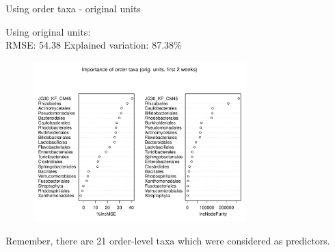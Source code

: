 \documentclass{beamer}
\begin{document}
\begin{frame}{Using order taxa - original units}

  {\scriptsize
    
  \noindent Using original units:\\
  RMSE: 54.38  \hspace{0.05in}  Explained variation: 87.38\%

  \begin{center}
    \begin{figure}
      \includegraphics[width=3.25in]{../only_orders/first_two_weeks/orig_units_first_two_weeks_orders_imp_plot}
    \end{figure}
  \end{center}
  \vspace{-0.25in}

\noindent Remember, there are 21 order-level taxa which were considered as predictors.
}

\end{frame}
\end{document}
